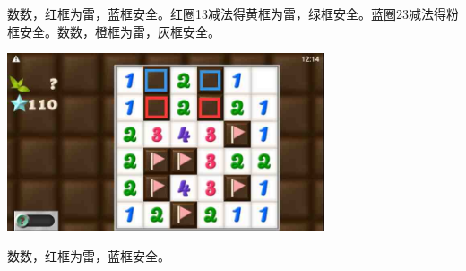 数数，红框为雷，蓝框安全。红圈13减法得黄框为雷，绿框安全。蓝圈23减法得粉框安全。数数，橙框为雷，灰框安全。
\begin{center}
    \includegraphics[width=0.7\textwidth]{puzzlelow/238-5.jpg}
\end{center}
数数，红框为雷，蓝框安全。

